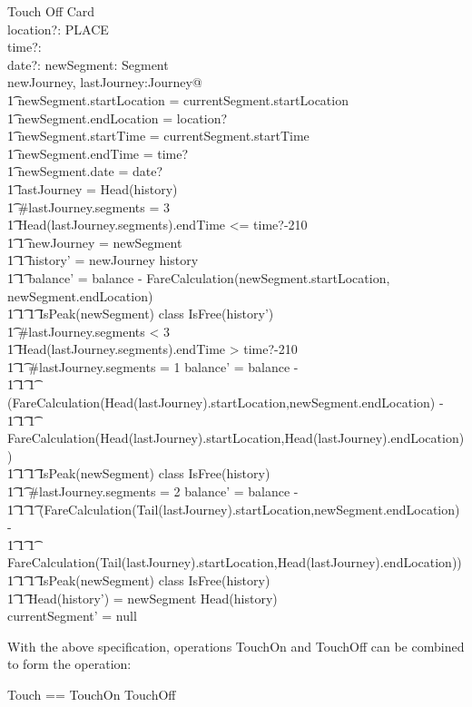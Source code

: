 \documentclass{article}
\begin{document}
\begin{schema}{Touch Off}
\Delta Card\\
location?: PLACE\\
time?: \nat\\
date?: \nat
\where
\exists newSegment: Segment \land\\
\exists newJourney, lastJourney:Journey@\\
\t1 newSegment.startLocation = currentSegment.startLocation\land\\
\t1 newSegment.endLocation = location?\land\\
\t1 newSegment.startTime = currentSegment.startTime\land\\
\t1 newSegment.endTime = time?\land\\
\t1 newSegment.date = date?\land\\
\t1 lastJourney = Head(history)\\
\t1 \#lastJourney.segments = 3 \lor \\
\t1 Head(lastJourney.segments).endTime <= time?-210 \implies \\
\t1 \t1 newJourney = \langle newSegment \rangle\\
\t1 \t1 history' = newJourney \cat history \\
\t1 \t1 balance' = balance - FareCalculation(newSegment.startLocation,
newSegment.endLocation) \cross\\
\t1 \t1 \t1 IsPeak(newSegment) \cross class \cross IsFree(history')\\ 
\t1 \#lastJourney.segments < 3 \land \\
\t1 Head(lastJourney.segments).endTime > time?-210 \implies \\
\t1 \t1 \#lastJourney.segments = 1 \implies balance' = balance - \\
\t1 \t1 \t1
(FareCalculation(Head(lastJourney).startLocation,newSegment.endLocation)
-\\
\t1 \t1 \t1 
FareCalculation(Head(lastJourney).startLocation,Head(lastJourney).endLocation))
\cross\\
\t1 \t1 \t1  IsPeak(newSegment) \cross class \cross IsFree(history)\\ 
\t1 \t1 \#lastJourney.segments = 2 \implies balance' = balance - \\
\t1 \t1 \t1
(FareCalculation(Tail(lastJourney).startLocation,newSegment.endLocation)
-\\
\t1 \t1 \t1 
FareCalculation(Tail(lastJourney).startLocation,Head(lastJourney).endLocation))
\cross\\
\t1 \t1 \t1  IsPeak(newSegment) \cross class \cross IsFree(history)\\ 
\t1 \t1 Head(history') = newSegment \cat Head(history)\\
currentSegment' = null	
\end{schema}



With the above specification, operations TouchOn and TouchOff can be combined to
form the operation:
\begin{zed} 
Touch == TouchOn \lor TouchOff
\end{zed}
\end{document}
